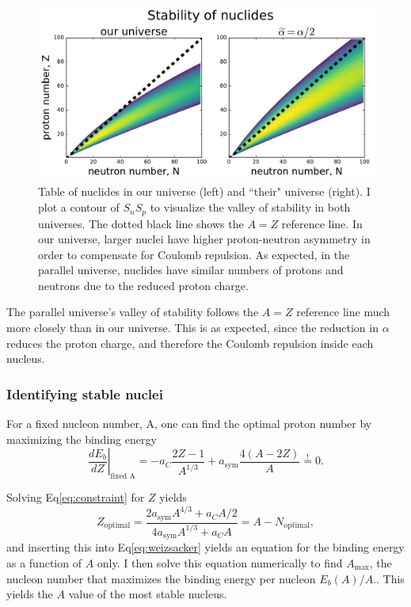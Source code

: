 \documentclass[%
 reprint,
 amsmath,amssymb,
 aps,
]{revtex4-1}
\begin{document}
\begin{figure}[h!]
	\centering
	\includegraphics[width=\linewidth]{fig/nuclides.pdf}
	\caption{\label{fig:nuclides}Table of nuclides in our universe (left) and ``their" universe (right). I plot a contour of $S_n S_p$ to visualize the valley of stability in both universes. The dotted black line shows the $A=Z$ reference line. In our universe, larger nuclei have higher proton-neutron asymmetry in order to compensate for Coulomb repulsion. As expected, in the parallel universe, nuclides have similar numbers of protons and neutrons due to the reduced proton charge.}
\end{figure}

The parallel universe's valley of stability follows the $A=Z$ reference line much more closely than in our universe. This is as expected, since the reduction in $\alpha$ reduces the proton charge, and therefore the Coulomb repulsion inside each nucleus.

\subsubsection{\label{sec:stable_nuclei}Identifying stable nuclei}

For a fixed nucleon number, A, one can find the optimal proton number by maximizing the binding energy
\begin{equation}
	\left. \frac{d E_b}{d Z}\right|_{\text{fixed A}} =
	- a_C \frac{2Z - 1}{A^{1/3}}
	+ a_{\text{sym}} \frac{4 (A - 2Z)}{A}
	\overset{!}{=} 0.
	\label{eq:constraint}
\end{equation}

Solving Eq\eqref{eq:constraint} for $Z$ yields
\begin{equation}
	Z_\text{optimal} = \frac{2 a_\text{sym} A^{4/3} + a_C A / 2}{
	4 a_\text{sym} A^{1/3} + a_C A}
	= A - N_\text{optimal},
\end{equation}
and inserting this into Eq\eqref{eq:weizsacker} yields an equation for the binding energy as a function of $A$ only. I then solve this equation numerically to find $A_\text{max}$, the nucleon number that maximizes the binding energy per nucleon $E_b(A) / A$.\cite{jupyter_notebook}. This yields the $A$ value of the most stable nucleus.
\end{document}
